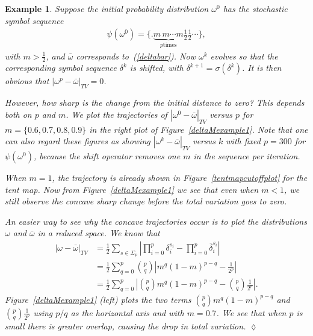 \documentclass[final]{siamltex}
\newtheorem{example_base}{Example}
\newenvironment{example}{\begin{example_base}}
   {\hspace{\stretch{1}}$\lozenge$\end{example_base}}
\begin{document}
\begin{example}
  \label{example:constantoega0}
  Suppose the initial probability distribution $\omega^0$ has the
  stochastic symbol sequence
  \begin{align}
    \label{constantomega0}
    \psi(\omega^0) = \Big\{.\underbrace{m \, m \cdots m}_{\text{$p$
        times}}\frac{1}{2}\frac{1}{2}\cdots\Big\},
  \end{align}
  with $m >\frac{1}{2}$, and $\bar{\omega}$ corresponds
  to~(\ref{deltabar}). Now $\omega^k$ evolves so that the
  corresponding symbol sequence $\delta^k$ is shifted, with
  $\delta^{k+1} = \sigma(\delta^k)$. It is then obvious that
  $|\omega^p-\bar{\omega}|_{TV} = 0$.

  However, how sharp is the change from the initial distance to zero?
  This depends both on $p$ and $m$. We plot the trajectories of
  $|\omega^0-\bar{\omega} |_{TV}$ versus $p$ for $m=\{0.6,
  0.7,0.8,0.9\}$ in the right plot of
  Figure~\ref{deltaMexample1}. Note that one can also regard these
  figures as showing $|\omega^k-\bar{\omega}|_{TV}$ versus $k$ with
  fixed $p=300$ for $\psi(\omega^0)$, because the shift operator
  removes one $m$ in the sequence per iteration.
  
  When $m=1$, the trajectory is already shown in
  Figure~\ref{tentmapcutoffplot} for the tent map. Now from
  Figure~\ref{deltaMexample1} we see that even when $m < 1$, we still
  observe the concave sharp change before the total variation goes to
  zero.

  An easier way to see why the concave trajectories occur is to plot
  the distributions $\omega$ and $\bar{\omega}$ in a reduced space. We
  know that
  \begin{align}
    |\omega-\bar{\omega}|_{TV} &= \frac{1}{2} \sum_{s\in\Sigma_{p}}
    \left| \prod_{i=0}^p\delta_i^{s_i}-\prod_{i=0}^p\bar{\delta}_i^{s_i}  \right| \nonumber\\
    &= \frac{1}{2} \sum_{q=0}^p
    {p \choose q} \left|m^q (1-m)^{p-q} - \frac{1}{2^p} \right| \nonumber \\
    &= \frac{1}{2} \sum_{q=0}^p \left|{p \choose q} m^q (1-m)^{p-q}
      -{p \choose q} \frac{1}{2^p} \right|.
    \label{eqn:constantoega0_binomials}
  \end{align}
  Figure~\ref{deltaMexample1} (left) plots the two terms ${p \choose
    q} m^q (1-m)^{p-q}$ and ${p \choose q} \frac{1}{2^p}$ using $p/q$
  as the horizontal axis and with $m = 0.7$. We see that when $p$ is
  small there is greater overlap, causing the drop in total variation.
\end{example}
\end{document}
